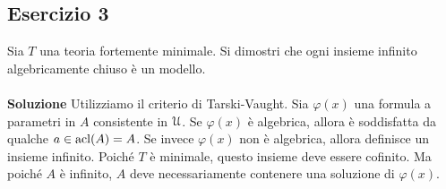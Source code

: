 \documentclass[10pt,a4paper]{article}
\def\phi{\varphi}
\def\U{\EuScript U}
\def\acl{{\rm acl}}
\begin{document}
\subsection*{Esercizio 3}
Sia $T$ una teoria fortemente minimale. Si dimostri che ogni insieme infinito algebricamente chiuso è un modello.\\
\\
\noindent\textbf{Soluzione} Utilizziamo il criterio di Tarski-Vaught. Sia $\phi(x)$ una formula a parametri in $A$ consistente in $\U$. Se $\phi(x)$ è algebrica, allora è soddisfatta da qualche $a \in \acl(A)=A$. Se invece $\phi(x)$ non è algebrica, allora definisce un insieme infinito. Poiché $T$ è minimale, questo insieme deve essere cofinito. Ma poiché $A$ è infinito, $A$ deve necessariamente contenere una soluzione di $\phi(x)$.
\end{document}
